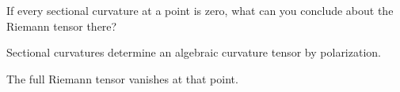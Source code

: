\begin{exercise}\label{exr:vii26-ped-16}
If every sectional curvature at a point is zero, what can you conclude about the Riemann tensor there?
\end{exercise}

\begin{hint}
Sectional curvatures determine an algebraic curvature tensor by polarization.
\end{hint}

\begin{solution}
The full Riemann tensor vanishes at that point.
\end{solution}

